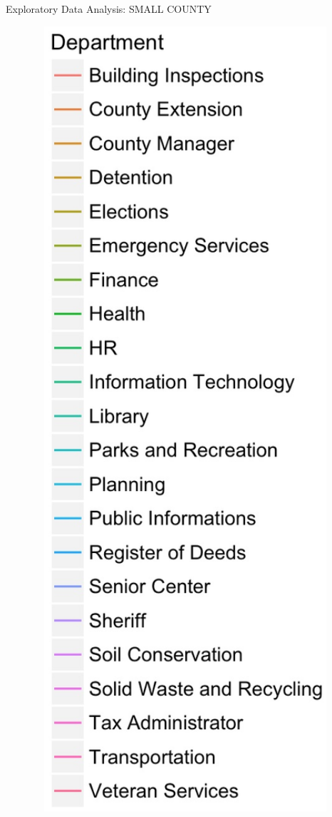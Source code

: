 \documentclass[10pt]{beamer}
\theoremstyle{definition}
\theoremstyle{remark}
\begin{document}
\begin{frame}{Exploratory Data Analysis: SMALL COUNTY}
\begin{minipage}{0.13\linewidth}
\begin{figure}
	 		 		 	\includegraphics[width=1.25\textwidth]{figures/Dept2.jpg}
	 \end{figure}	
	\end{minipage}
\end{frame}
\end{document}
